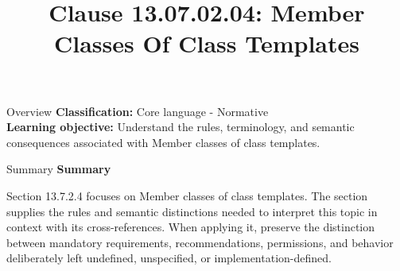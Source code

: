 \documentclass[10pt,letterpaper]{article}
\title{Clause 13.07.02.04: Member Classes Of Class Templates}
\author{}
\date{}
\begin{document}
\maketitle
\begin{CornellOverviewBox}{Overview}
\textbf{Classification:} Core language - Normative\\[2pt]
\textbf{Learning objective:} Understand the rules, terminology, and semantic consequences associated with Member classes of class templates.
\end{CornellOverviewBox}\begin{CornellSummaryBox}{Summary}
{\sffamily\bfseries\color{Accent} Summary}\par\vspace{3pt}Section 13.7.2.4 focuses on Member classes of class templates. The section supplies the rules and semantic distinctions needed to interpret this topic in context with its cross-references. When applying it, preserve the distinction between mandatory requirements, recommendations, permissions, and behavior deliberately left undefined, unspecified, or implementation-defined.
\end{CornellSummaryBox}
\end{document}
